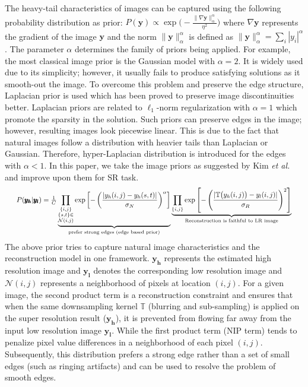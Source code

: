 \documentclass[9pt]{article}
\newcommand{\vect}[1]{\pmb{#1}}
\def\bea{\begin{eqnarray}}
\def\eea{\end{eqnarray}}
\begin{document}
The heavy-tail characteristics of  images can be captured using the following probability distribution as prior: $P(\vect y) \propto \exp \Big( -\frac{\|\nabla \vect y \|_\alpha^\alpha }{\eta^2} \Big)$
where $\nabla \vect y$ represents the gradient of the image $\vect y$ and the norm $\|\vect y\|_\alpha^\alpha$ is defined as $\|\vect y\|_\alpha^\alpha = \sum_i |y_i|^\alpha$. The parameter $\alpha$ determines the family of priors being applied. For example, the most classical image prior is the Gaussian model with $\alpha=2$. It is widely used due to its simplicity; however, it usually fails to produce satisfying solutions as it smooth-out the image.
 To overcome this problem and preserve the edge structure, Laplacian prior is used which has been proved to preserve image discontinuities better.
Laplacian priors are related to $\ell_1$-norm regularization with $\alpha=1$ which promote the sparsity in the solution. Such priors can preserve edges in the image; however,  resulting images look piecewise linear. This is due to the fact that natural images follow a distribution with heavier tails than Laplacian or Gaussian. Therefore,  hyper-Laplacian distribution is introduced for the edges \cite{zhang2012generative,krishnan2009fast} with  $\alpha < 1$.
In this paper, we take the image priors as suggested by Kim \emph{et al.} \cite{kim2010single,tappen2003exploiting} and improve upon them for SR task.
\bea\resizebox{0.96\columnwidth}{!}{$
        P(\vect {y_h} | \vect {y_l}) = \frac{1}{C} \underbrace{ \prod_{\substack{\{i,j\} \\ \{s,t\}\in \\\mathcal{N}(i,j)} }  \exp \left[ - \left( \frac{|y_h(i,j) - y_h(s,t)|}{\sigma_N} \right)^\alpha \right] }_{\text{prefer strong edges (edge based prior)}}
                                    \underbrace{ \prod_{ \{i,j\}  }  \exp \left[ - \left( \frac{|\mathbb{T} \big( y_h(i,j) \big) - y_l(i,j)|}{\sigma_R} \right)^2 \right] }_{\text{Reconstruction is faithful to LR image}} \label{Eq:NIP_orig}
                                    $}
\eea
The above prior tries to capture natural image characteristics  and  the reconstruction model in one framework. $\vect{y_h}$ represents the estimated high resolution image and $\vect{y_l}$ denotes the corresponding low resolution image and $\mathcal{N}(i,j)$ represents a neighborhood of pixels at location $(i,j)$. For a given image, the second product
term is a reconstruction constraint and ensures that  when the same downsampling kernel $\mathbb{T}$ (blurring and sub-sampling) is applied on the super resolution result ($\vect{y_h}$), it is prevented from flowing far away from the input low resolution image $\vect{y_l}$.
While the first product term (NIP term) tends to penalize pixel value differences in a neighborhood of each pixel $(i,j)$. Subsequently, this distribution prefers a strong edge rather than
a set of small edges (such as ringing artifacts) and can be used to resolve the problem
of smooth edges.
\end{document}
